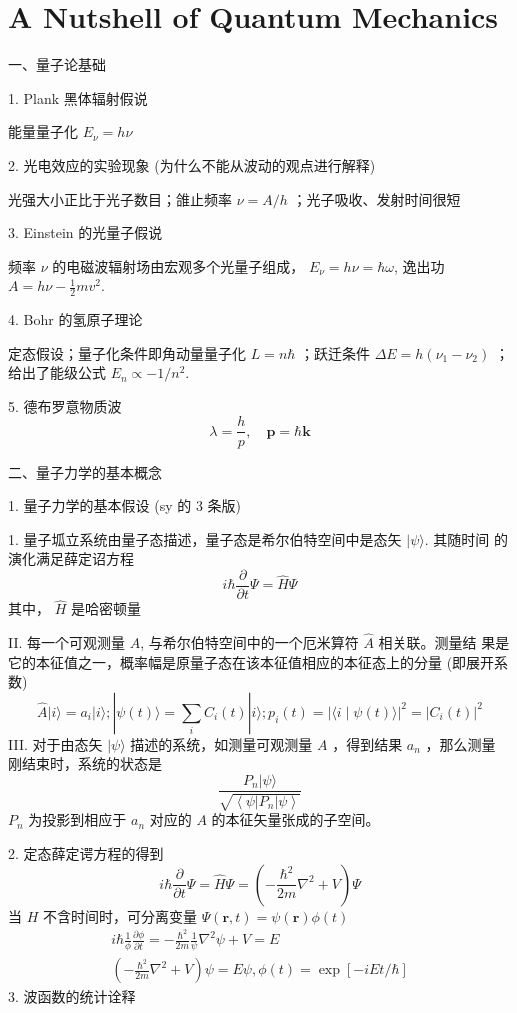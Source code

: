 \documentclass[../../note.tex]{subfiles}
\begin{document}
\chapter{A Nutshell of Quantum Mechanics}
一、量子论基础

1. Plank 黑体辐射假说

能量量子化 $E_\nu=h \nu$

2. 光电效应的实验现象 (为什么不能从波动的观点进行解释)

光强大小正比于光子数目；䧻止频率 $\nu=A / h$ ；光子吸收、发射时间很短

3. Einstein 的光量子假说

频率 $\nu$ 的电磁波辐射场由宏观多个光量子组成， $E_\nu=h \nu=\hbar \omega$, 逸出功 $A=h \nu-\frac{1}{2} m v^2$.

4. Bohr 的氢原子理论

定态假设；量子化条件即角动量量子化 $L=n \hbar$ ；跃迁条件 $\Delta E=h\left(\nu_1-\nu_2\right)$ ； 给出了能级公式 $E_n \propto-1 / n^2$.

5. 德布罗意物质波
$$
\lambda=\frac{h}{p}, \quad \boldsymbol{p}=\hbar \boldsymbol{k}
$$

二、量子力学的基本概念

1. 量子力学的基本假设 (sy 的 3 条版)

1. 量子坬立系统由量子态描述，量子态是希尔伯特空间中是态矢 $|\psi\rangle$. 其随时间 的演化满足薛定诏方程
$$
i \hbar \frac{\partial}{\partial t} \Psi=\hat{H} \Psi
$$
其中， $\hat{H}$ 是哈密顿量

II. 每一个可观测量 $A$, 与希尔伯特空间中的一个厄米算符 $\hat{A}$ 相关联。测量结 果是它的本征值之一，概率幅是原量子态在该本征值相应的本征态上的分量 (即展开系数)
$$
\hat{A}|i\rangle=a_i|i\rangle ;|\psi(t)\rangle=\sum_i C_i(t)|i\rangle ; p_i(t)=|\langle i \mid \psi(t)\rangle|^2=\left|C_i(t)\right|^2
$$
III. 对于由态矢 $|\psi\rangle$ 描述的系统，如测量可观测量 $A$ ，得到结果 $a_n$ ，那么测量 刚结束时，系统的状态是
$$
\frac{P_n|\psi\rangle}{\sqrt{\left\langle\psi\left|P_n\right| \psi\right\rangle}}
$$
$P_n$ 为投影到相应于 $a_n$ 对应的 $A$ 的本征矢量张成的子空间。

2. 定态薛定谔方程的得到
$$
i \hbar \frac{\partial}{\partial t} \Psi=\hat{H} \Psi=\left(-\frac{\hbar^2}{2 m} \nabla^2+V\right) \Psi
$$
当 $H$ 不含时间时，可分离变量 $\Psi(\boldsymbol{r}, t)=\psi(\boldsymbol{r}) \phi(t)$
$$
\begin{array}{r}
i \hbar \frac{1}{\phi} \frac{\partial \phi}{\partial t}=-\frac{\hbar^2}{2 m} \frac{1}{\psi} \nabla^2 \psi+V=E \\
\left(-\frac{\hbar^2}{2 m} \nabla^2+V\right) \psi=E \psi, \phi(t)=\exp [-i E t / \hbar]
\end{array}
$$
3. 波函数的统计诠释
\end{document}
